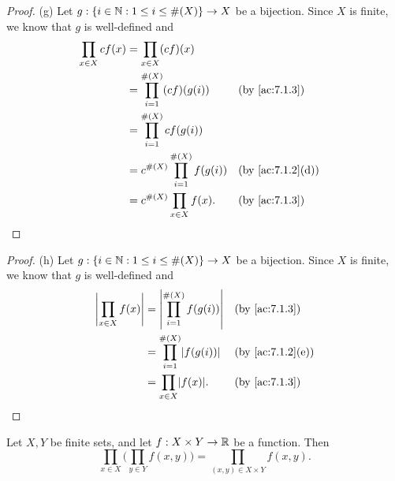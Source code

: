 \begin{proof}{(g)}
  Let \(g : \left\lbrace i \in \mathbb{N} : 1 \leq i \leq \#(X)\right\rbrace \to X\) be a bijection.
  Since \(X\) is finite, we know that \(g\) is well-defined and
  \begin{align*}
    \prod_{x \in X} cf(x) & = \prod_{x \in X} (cf)(x)                                       \\
                          & = \prod_{i = 1}^{\#(X)} (cf)(g(i))        &  & \by{ac:7.1.3}    \\
                          & = \prod_{i = 1}^{\#(X)} cf(g(i))                                \\
                          & = c^{\#(X)} \prod_{i = 1}^{\#(X)} f(g(i)) &  & \by{ac:7.1.2}[d] \\
                          & = c^{\#(X)} \prod_{x \in X} f(x).         &  & \by{ac:7.1.3}
  \end{align*}
\end{proof}

\begin{proof}{(h)}
  Let \(g : \left\lbrace i \in \mathbb{N} : 1 \leq i \leq \#(X)\right\rbrace \to X\) be a bijection.
  Since \(X\) is finite, we know that \(g\) is well-defined and
  \begin{align*}
    \abs{\prod_{x \in X} f(x)} & = \abs{\prod_{i = 1}^{\#(X)} f(g(i))} &  & \by{ac:7.1.3}    \\
                               & = \prod_{i = 1}^{\#(X)} \abs{f(g(i))} &  & \by{ac:7.1.2}[e] \\
                               & = \prod_{x \in X} \abs{f(x)}.         &  & \by{ac:7.1.3}
  \end{align*}
\end{proof}

\begin{ac}\label{ac:7.1.6}
  Let \(X, Y\) be finite sets, and let \(f : X \times Y \to \mathbb{R}\) be a function.
  Then
  \[
    \prod_{x \in X} \bigg(\prod_{y \in Y} f(x, y)\bigg) = \prod_{(x, y) \in X \times Y} f(x, y).
  \]
\end{ac}


